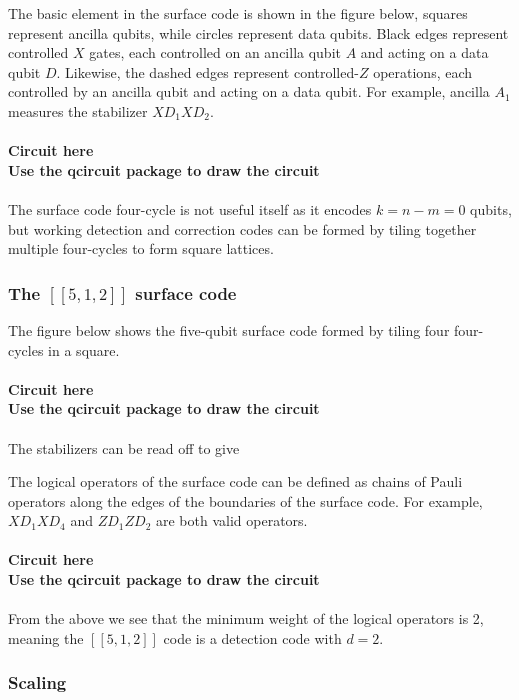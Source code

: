 \documentclass[final,5p,times,twocolumn,authoryear]{elsarticle}
\begin{document}
The basic element in the surface code is shown in the figure below, squares represent ancilla qubits, while circles represent data qubits. Black edges represent controlled $X$ gates, each controlled on an ancilla qubit $A$ and acting on a data qubit $D$. Likewise, the dashed edges represent controlled-$Z$ operations, each controlled by an ancilla qubit and acting on a data qubit.
For example, ancilla $A_1$ measures the stabilizer $XD_1XD_2$.
\\
\\
\textbf{Circuit here}
\\
\textbf{Use the qcircuit package to draw the circuit}
\\
\\
The surface code four-cycle is not useful itself as it encodes $k=n-m=0$ qubits, but working detection and correction codes can be formed by tiling together multiple four-cycles to form square lattices.

\subsubsection{The $[[5, 1, 2]]$ surface code}

The figure below shows the five-qubit surface code formed by tiling four four-cycles in a square.
\\
\\
\textbf{Circuit here}
\\
\textbf{Use the qcircuit package to draw the circuit}
\\
\\
The stabilizers can be read off to give

The logical operators of the surface code can be defined as chains of Pauli operators along the edges of the boundaries of the surface code. For example, $XD_1XD_4$ and $ZD_1ZD_2$ are both valid operators.
\\
\\
\textbf{Circuit here}
\\
\textbf{Use the qcircuit package to draw the circuit}
\\
\\
From the above we see that the minimum weight of the logical operators is 2, meaning the $[[5,1,2]]$ code is a detection code with $d=2$.

\subsubsection{Scaling}
\end{document}

